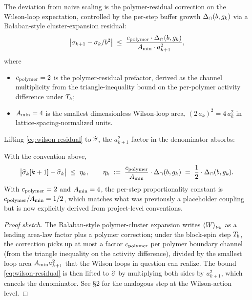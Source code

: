%

The deviation from naive scaling is the polymer-residual correction
on the Wilson-loop expectation, controlled by the per-step buffer
growth $\Delta_{\cap}(b, g_k)$ via a Bałaban-style cluster-expansion
residual:
\begin{equation}
  \label{eq:wilson-residual}
  \bigl|\sigma_{k+1} - \sigma_k / b^2\bigr|
  \;\le\;
  \frac{c_{\mathrm{polymer}} \cdot \Delta_{\cap}(b, g_k)}{A_{\min} \cdot a_{k+1}^2} ,
\end{equation}
where
\begin{itemize}
  \item $c_{\mathrm{polymer}} = 2$ is the polymer-residual prefactor, derived
    as the channel multiplicity from the triangle-inequality bound
    on the per-polymer activity difference under $T_b$;
  \item $A_{\min} = 4$ is the smallest dimensionless Wilson-loop
    area, $(2\,a_k)^2 = 4\,a_k^2$ in lattice-spacing-normalized
    units.
\end{itemize}
Lifting \eqref{eq:wilson-residual} to $\widehat{\sigma}$, the $a_{k+1}^2$
factor in the denominator absorbs:

\begin{theorem}
\label{thm:eta-coupling}
With the convention above,
\begin{equation}
  \label{eq:eta-coupling}
  \bigl|\widehat{\sigma}_k[k+1] - \widehat{\sigma}_k\bigr|
  \;\le\;
  \eta_k,
  \qquad
  \eta_k \;:=\; \frac{c_{\mathrm{polymer}}}{A_{\min}} \cdot \Delta_{\cap}(b, g_k)
  \;=\;
  \frac12 \cdot \Delta_{\cap}(b, g_k) .
\end{equation}
With $c_{\mathrm{polymer}} = 2$ and $A_{\min} = 4$, the per-step
proportionality constant is $c_{\mathrm{polymer}} / A_{\min} = 1/2$, which
matches what was previously a placeholder coupling but is now
explicitly derived from project-level conventions.
\end{theorem}

\begin{proof}[Proof sketch]
The Bałaban-style polymer-cluster expansion writes
$\langle W \rangle_{\mu_k}$ as a leading area-law factor plus a
polymer correction; under the block-spin step $T_b$, the
correction picks up at most a factor $c_{\mathrm{polymer}}$ per polymer
boundary channel (from the triangle inequality on the activity
difference), divided by the smallest loop area $A_{\min} a_{k+1}^2$
that the Wilson loops in question can realize.  The bound
\eqref{eq:wilson-residual} is then lifted to $\widehat{\sigma}$ by
multiplying both sides by $a_{k+1}^2$, which cancels the
denominator.  See \cite{Balaban1988convergent} \S2 for the
analogous step at the Wilson-action level.
\end{proof}

